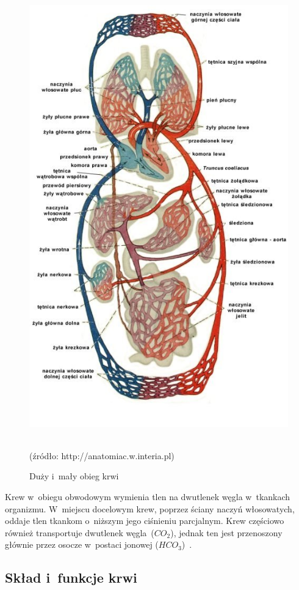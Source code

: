 \begin{figure}[ht]
	\centerline{\includegraphics[scale = 0.84]{graphic/obieg_krwi.jpg}}
	\caption{Duży i~mały obieg krwi}
	~\\
	(źródło: http://anatomiac.w.interia.pl)
	\label{rys:circ}
\end{figure}
Krew w~obiegu obwodowym wymienia tlen na dwutlenek węgla w~tkankach organizmu. W~miejscu docelowym krew, poprzez ściany naczyń włosowatych, oddaje tlen 
tkankom o~niższym jego ciśnieniu parcjalnym. Krew częściowo również transportuje dwutlenek węgla~($CO_{2}$), jednak ten jest przenoszony głównie przez 
osocze w~postaci jonowej ($HCO_{3}$)~\cite{Fizj:2007}.
 
\subsection{Skład i~funkcje krwi}
\label{subsec:SkladKrwi}

